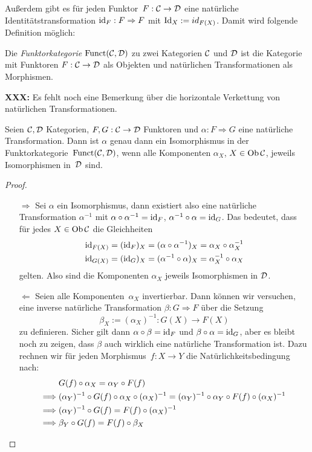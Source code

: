 Außerdem gibt es für jeden Funktor~$F:\mathcal{C}\to\mathcal{D}$ eine natürliche
Identitätstransformation $\mathrm{id}_F : F \Rightarrow F$ mit $\mathrm{Id}_X := id_{F(X)}$.
Damit wird folgende Definition möglich:
\begin{defn}
Die \emph{Funktorkategorie} $\mathrm{Funct}(\mathcal{C},\mathcal{D})$ zu zwei Kategorien $\mathcal{C}$ und $\mathcal{D}$
ist die Kategorie mit Funktoren $F: \mathcal{C} \to \mathcal{D}$ als Objekten und natürlichen
Transformationen als Morphismen.
\end{defn}

\textbf{XXX:} Es fehlt noch eine Bemerkung über die horizontale Verkettung von
natürlichen Transformationen.

\begin{lemma}\label{natTransIsoLemma}
Seien $\mathcal{C},\mathcal{D}$ Kategorien, $F,G: \mathcal{C} \to \mathcal{D}$ Funktoren und $\alpha: F \Rightarrow
G$ eine natürliche Transformation. Dann ist $\alpha$ genau dann ein
Isomorphismus in der Funktorkategorie~$\mathrm{Funct}(\mathcal{C},\mathcal{D})$, wenn alle Komponenten
$\alpha_X$, $X \in \operatorname{Ob}\mathcal{C}$, jeweils Isomorphismen in~$\mathcal{D}$ sind.
\end{lemma}

\begin{proof}\begin{itemize}
\item[\glqq$\Rightarrow$\grqq] Sei $\alpha$ ein Isomorphismus, dann existiert
also eine natürliche Transformation $\alpha^{-1}$ mit $\alpha \circ \alpha^{-1}
= \mathrm{id}_F$, $\alpha^{-1} \circ \alpha = \mathrm{id}_G$. Das bedeutet, dass für jedes $X
\in \operatorname{Ob}\mathcal{C}$ die Gleichheiten
\begin{align*}
	\mathrm{id}_{F(X)} = (\mathrm{id}_F)_X = (\alpha \circ \alpha^{-1})_X = \alpha_X \circ \alpha^{-1}_X \\	
	\mathrm{id}_{G(X)} = (\mathrm{id}_G)_X = (\alpha^{-1} \circ \alpha)_X = \alpha^{-1}_X \circ \alpha_X
\end{align*}
gelten. Also sind die Komponenten $\alpha_X$ jeweils Isomorphismen in $\mathcal{D}$.
\item[\glqq$\Leftarrow$\grqq] Seien alle Komponenten~$\alpha_X$ invertierbar.
Dann können wir versuchen, eine inverse natürliche Transformation $\beta: G
\Rightarrow F$ über die Setzung
\[ \beta_X := (\alpha_X)^{-1} : G(X) \to F(X) \]
zu definieren. Sicher gilt dann $\alpha \circ \beta = \mathrm{id}_F$ und $\beta \circ \alpha
= \mathrm{id}_G$, aber es bleibt noch zu zeigen, dass $\beta$ auch wirklich eine natürliche
Transformation ist. Dazu rechnen wir für jeden Morphismus~$f: X \to Y$ die
Natürlichkeitsbedingung nach:
\begin{align*}
  & G(f) \circ \alpha_X = \alpha_Y \circ F(f) \\
  \Longrightarrow{}& (\alpha_Y)^{-1} \circ G(f) \circ \alpha_X \circ (\alpha_X)^{-1} = (\alpha_Y)^{-1} \circ \alpha_Y \circ F(f) \circ (\alpha_X)^{-1} \\
  \Longrightarrow{}& (\alpha_Y)^{-1} \circ G(f) = F(f) \circ (\alpha_X)^{-1} \\
  \Longrightarrow{}& \beta_Y \circ G(f) = F(f) \circ \beta_X \qedhere
\end{align*}
\end{itemize}
\end{proof}

